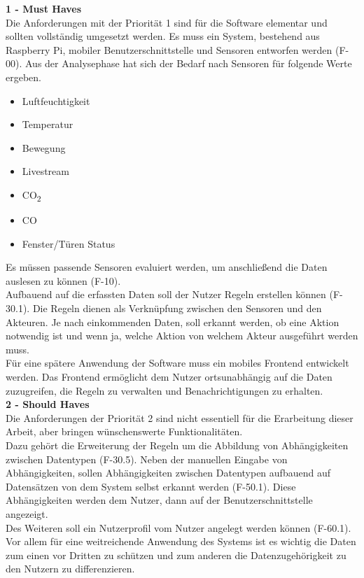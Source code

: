 \textbf{1 - Must Haves}\\
Die Anforderungen mit der Priorität 1 sind für die Software elementar und sollten vollständig umgesetzt werden. 
Es muss ein System, bestehend aus Raspberry Pi, mobiler Benutzerschnittstelle und Sensoren entworfen werden (F-00). Aus der Analysephase hat sich der Bedarf nach Sensoren für folgende Werte ergeben.
\begin{itemize}
\item Luftfeuchtigkeit
\item Temperatur
\item Bewegung
\item Livestream
\item CO\textsubscript{2}
\item CO
\item Fenster/Türen Status
\end{itemize}
Es müssen passende Sensoren evaluiert werden, um anschließend die Daten auslesen zu können (F-10).\\
Aufbauend auf die erfassten Daten soll der Nutzer Regeln erstellen können (F-30.1). Die Regeln dienen als Verknüpfung zwischen den Sensoren und den Akteuren. Je nach einkommenden Daten, soll erkannt werden, ob eine Aktion notwendig ist und wenn ja, welche Aktion von welchem Akteur ausgeführt werden muss.\\
Für eine spätere Anwendung der Software muss ein mobiles Frontend entwickelt werden. Das Frontend ermöglicht dem Nutzer ortsunabhängig auf die Daten zuzugreifen, die Regeln zu verwalten und Benachrichtigungen zu erhalten.\\
\textbf{2 - Should Haves}\\
Die Anforderungen der Priorität 2 sind nicht essentiell für die Erarbeitung dieser Arbeit, aber bringen wünschenswerte Funktionalitäten.\\
Dazu gehört die Erweiterung der Regeln um die Abbildung von Abhängigkeiten zwischen Datentypen (F-30.5). Neben der manuellen Eingabe von Abhängigkeiten, sollen Abhängigkeiten zwischen Datentypen aufbauend auf Datensätzen von dem System selbst erkannt werden (F-50.1). Diese Abhängigkeiten werden dem Nutzer, dann auf der Benutzerschnittstelle angezeigt.\\
Des Weiteren soll ein Nutzerprofil vom Nutzer angelegt werden können (F-60.1). Vor allem für eine weitreichende Anwendung des Systems ist es wichtig die Daten zum einen vor Dritten zu schützen und zum anderen die Datenzugehörigkeit zu den Nutzern zu differenzieren.\\
